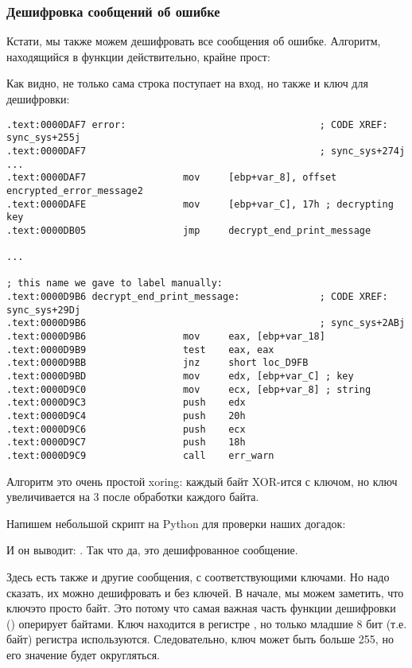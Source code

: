 \subsubsection{Дешифровка сообщений об ошибке}

Кстати, мы также можем дешифровать все сообщения об ошибке.
Алгоритм, находящийся в функции  
действительно, крайне прост:



Как видно, не только сама строка поступает на вход, но также и ключ для дешифровки:

\begin{lstlisting}
.text:0000DAF7 error:                                  ; CODE XREF: sync_sys+255j
.text:0000DAF7                                         ; sync_sys+274j ...
.text:0000DAF7                 mov     [ebp+var_8], offset encrypted_error_message2
.text:0000DAFE                 mov     [ebp+var_C], 17h ; decrypting key
.text:0000DB05                 jmp     decrypt_end_print_message

...

; this name we gave to label manually:
.text:0000D9B6 decrypt_end_print_message:              ; CODE XREF: sync_sys+29Dj
.text:0000D9B6                                         ; sync_sys+2ABj
.text:0000D9B6                 mov     eax, [ebp+var_18]
.text:0000D9B9                 test    eax, eax
.text:0000D9BB                 jnz     short loc_D9FB
.text:0000D9BD                 mov     edx, [ebp+var_C] ; key
.text:0000D9C0                 mov     ecx, [ebp+var_8] ; string
.text:0000D9C3                 push    edx
.text:0000D9C4                 push    20h
.text:0000D9C6                 push    ecx
.text:0000D9C7                 push    18h
.text:0000D9C9                 call    err_warn
\end{lstlisting}

Алгоритм это очень простой \gls{xoring}: 
каждый байт XOR-ится с ключом, но ключ увеличивается на 3 после обработки каждого байта.

Напишем небольшой скрипт на Python для проверки наших догадок:



И он выводит: .
Так что да, это дешифрованное сообщение.

Здесь есть также и другие сообщения, с соответствующими ключами.
Но надо сказать, их можно дешифровать и без ключей.
В начале, мы можем заметить, что ключ\EMDASH{}это просто байт.
Это потому что самая важная часть функции дешифровки
(\XOR) оперирует байтами. 
Ключ находится в регистре \ESI, но только младшие 8 бит
(т.е. байт) регистра используются.
Следовательно, ключ может быть больше 255, 
но его значение будет округляться.

